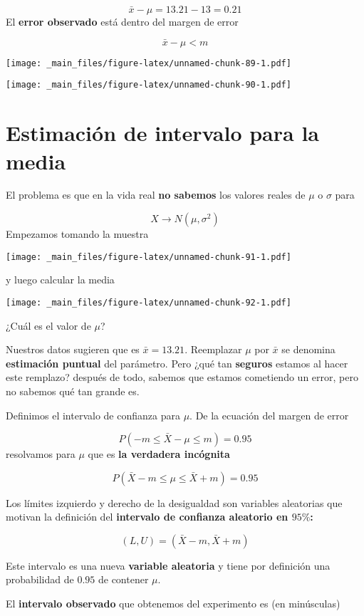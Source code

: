 \documentclass[
]{book}
\begin{document}
\[\bar{x}-\mu=13.21-13=0.21\]
El \textbf{error observado} está dentro del margen de error

\[\bar{x}-\mu <m\]

\texttt{[image: \_main\_files/figure-latex/unnamed-chunk-89-1.pdf]}

\texttt{[image: \_main\_files/figure-latex/unnamed-chunk-90-1.pdf]}

\hypertarget{estimaciuxf3n-de-intervalo-para-la-media}{%
\section{Estimación de intervalo para la media}\label{estimaciuxf3n-de-intervalo-para-la-media}}

El problema es que en la vida real \textbf{no sabemos} los valores reales de \(\mu\) o \(\sigma\) para

\[X \rightarrow N(\mu, \sigma^2)\]
Empezamos tomando la muestra

\texttt{[image: \_main\_files/figure-latex/unnamed-chunk-91-1.pdf]}

y luego calcular la media

\texttt{[image: \_main\_files/figure-latex/unnamed-chunk-92-1.pdf]}

¿Cuál es el valor de \(\mu\)?

Nuestros datos sugieren que es \(\bar{x}=13.21\). Reemplazar \(\mu\) por \(\bar{x}\) se denomina \textbf{estimación puntual} del parámetro. Pero ¿qué tan \textbf{seguros} estamos al hacer este remplazo? después de todo, sabemos que estamos cometiendo un error, pero no sabemos qué tan grande es.

Definimos el intervalo de confianza para \(\mu\). De la ecuación del margen de error

\[P(-m \leq \bar{X} - \mu \leq m)=0.95\]
resolvamos para \(\mu\) que es \textbf{la verdadera incógnita}

\[P(\bar{X} - m \leq \mu \leq \bar{X} + m)=0.95\]

Los límites izquierdo y derecho de la desigualdad son variables aleatorias que motivan la definición del \textbf{intervalo de confianza aleatorio en \(95\%\):}

\[(L,U)=(\bar{X} - m,\bar{X} + m)\]

Este intervalo es una nueva \textbf{variable aleatoria} y tiene por definición una probabilidad de \(0.95\) de contener \(\mu\).

El \textbf{intervalo observado} que obtenemos del experimento es (en minúsculas)
\end{document}
